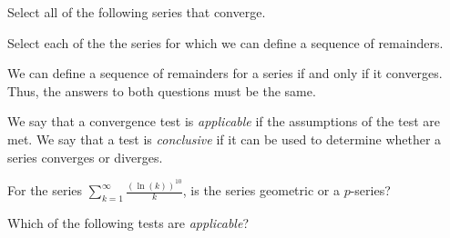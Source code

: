 \documentclass{ximera}
\author{Jim Talamo}
\begin{document}
\begin{exercise}

Select all of the following series that converge.

\begin{selectAll}
\end{selectAll}

Select each of the the series for which we can define a sequence of remainders.

\begin{selectAll}
\end{selectAll}

\begin{hint}

We can define a sequence of remainders for a series if and only if it converges.  Thus, the answers to both questions must be the same.

We say that a convergence test is \emph{applicable} if the assumptions of the test are met.  We say that a test is \emph{conclusive} if it can be used to determine whether a series converges or diverges.

\begin{question}
For the series $\sum_{k=1}^{\infty} \frac{(\ln(k))^{10}}{k}$, is the series geometric or a $p$-series?

\begin{multipleChoice}
\end{multipleChoice}

 Which of the following tests are \emph{applicable}?

\begin{selectAll}
\end{selectAll}



\end{question}
\end{hint}
\end{exercise}
\end{document}
